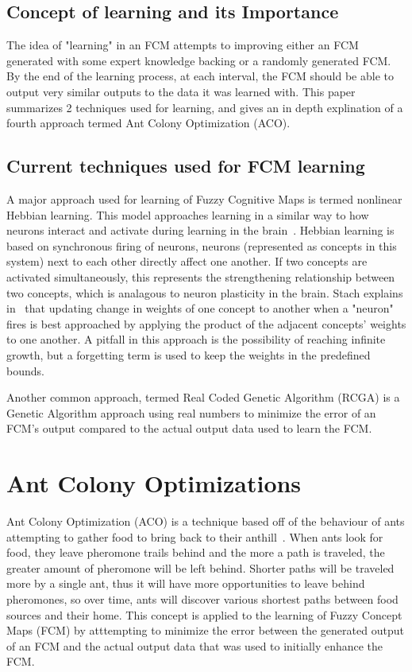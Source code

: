 \documentclass{umm-senior-sem}
\begin{document}
\subsection{Concept of learning and its Importance}
The idea of "learning" in an FCM attempts to improving either an FCM generated with some expert knowledge backing or a randomly generated FCM. By the end of the learning process, at each interval, the FCM should be able to output very similar outputs to the data it was learned with. This paper summarizes 2 techniques used for learning, and gives an in depth explination of a fourth approach termed Ant Colony Optimization (ACO). 

\subsection{Current techniques used for FCM learning}
A major approach used for learning of Fuzzy Cognitive Maps is termed nonlinear Hebbian learning. This model approaches learning in a similar way to how neurons interact and activate during learning in the brain~\cite{response:2003}. Hebbian learning is based on synchronous firing of neurons, neurons (represented as concepts in this system) next to each other directly affect one another. If two concepts are activated simultaneously, this represents the strengthening relationship between two concepts, which is analagous to neuron plasticity in the brain. Stach explains in~\cite{nhl:2008} that updating change in weights of one concept to another when a "neuron" fires is best approached by applying the product of the adjacent concepts' weights to one another. A pitfall in this approach is the possibility of reaching infinite growth, but a forgetting term is used to keep the weights in the predefined bounds. 

Another common approach, termed Real Coded Genetic Algorithm (RCGA) is a Genetic Algorithm approach using real numbers to minimize the error of an FCM's output compared to the actual output data used to learn the FCM.

\section{Ant Colony Optimizations}
\label{sec:aco}
Ant Colony Optimization (ACO) is a technique based off of the behaviour of ants attempting to gather food to bring back to their anthill~\cite{main:2012}. When ants look for food, they leave pheromone trails behind and the more a path is traveled, the greater amount of pheromone will be left behind. Shorter paths will be traveled more by a single ant, thus it will have more opportunities to leave behind pheromones, so over time, ants will discover various shortest paths between food sources and their home. This concept is applied to the learning of Fuzzy Concept Maps (FCM) by atttempting to minimize the error between the generated output of an FCM and the actual output data that was used to initially enhance the FCM. 
\end{document}
